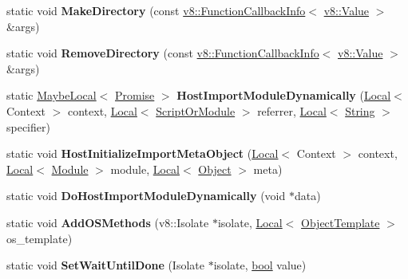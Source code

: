 \begin{DoxyCompactItemize}
static void {\bfseries Make\+Directory} (const \mbox{\hyperlink{classv8_1_1FunctionCallbackInfo}{v8\+::\+Function\+Callback\+Info}}$<$ \mbox{\hyperlink{classv8_1_1Value}{v8\+::\+Value}} $>$ \&args)
\item 
\mbox{\label{classv8_1_1Shell_aec493d82bcbc3295528d275f241cdfb6}} 
static void {\bfseries Remove\+Directory} (const \mbox{\hyperlink{classv8_1_1FunctionCallbackInfo}{v8\+::\+Function\+Callback\+Info}}$<$ \mbox{\hyperlink{classv8_1_1Value}{v8\+::\+Value}} $>$ \&args)
\item 
\mbox{\label{classv8_1_1Shell_a61ac42c0dc0311daed5c13fda5adc502}} 
static \mbox{\hyperlink{classv8_1_1MaybeLocal}{Maybe\+Local}}$<$ \mbox{\hyperlink{classv8_1_1Promise}{Promise}} $>$ {\bfseries Host\+Import\+Module\+Dynamically} (\mbox{\hyperlink{classv8_1_1Local}{Local}}$<$ Context $>$ context, \mbox{\hyperlink{classv8_1_1Local}{Local}}$<$ \mbox{\hyperlink{classv8_1_1ScriptOrModule}{Script\+Or\+Module}} $>$ referrer, \mbox{\hyperlink{classv8_1_1Local}{Local}}$<$ \mbox{\hyperlink{classv8_1_1String}{String}} $>$ specifier)
\item 
\mbox{\label{classv8_1_1Shell_a78b0a922bcc329b887225e955011178c}} 
static void {\bfseries Host\+Initialize\+Import\+Meta\+Object} (\mbox{\hyperlink{classv8_1_1Local}{Local}}$<$ Context $>$ context, \mbox{\hyperlink{classv8_1_1Local}{Local}}$<$ \mbox{\hyperlink{classv8_1_1Module}{Module}} $>$ module, \mbox{\hyperlink{classv8_1_1Local}{Local}}$<$ \mbox{\hyperlink{classv8_1_1Object}{Object}} $>$ meta)
\item 
\mbox{\label{classv8_1_1Shell_a9a27fc787b741806d3039c66a44cc9d5}} 
static void {\bfseries Do\+Host\+Import\+Module\+Dynamically} (void $\ast$data)
\item 
\mbox{\label{classv8_1_1Shell_a0c3ed68c0e468e6af07123281259de4c}} 
static void {\bfseries Add\+O\+S\+Methods} (v8\+::\+Isolate $\ast$isolate, \mbox{\hyperlink{classv8_1_1Local}{Local}}$<$ \mbox{\hyperlink{classv8_1_1ObjectTemplate}{Object\+Template}} $>$ os\+\_\+template)
\item 
\mbox{\label{classv8_1_1Shell_a2accf186325abc4d312accd69871e287}} 
static void {\bfseries Set\+Wait\+Until\+Done} (Isolate $\ast$isolate, \mbox{\hyperlink{classbool}{bool}} value)

\end{DoxyCompactItemize}
